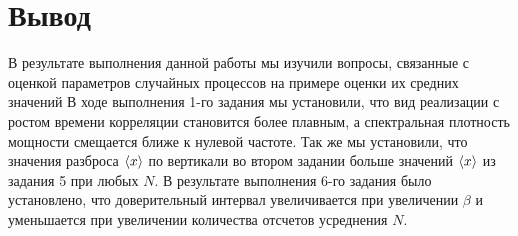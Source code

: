 \section{Вывод}
В результате выполнения данной работы мы изучили вопросы, связанные с оценкой параметров случайных процессов на примере оценки их средних значений
В ходе выполнения 1-го задания мы установили, что вид реализации с ростом времени корреляции становится более плавным, а спектральная плотность мощности смещается ближе к нулевой частоте.
Так же мы установили, что значения разброса $\langle x\rangle$ по вертикали во втором задании больше значений $\langle x\rangle$ из задания 5 при любых $N$.
В результате выполнения 6-го задания было установлено, что доверительный интервал увеличивается при увеличении $\beta$ и уменьшается при увеличении количества отсчетов усреднения $N$.


